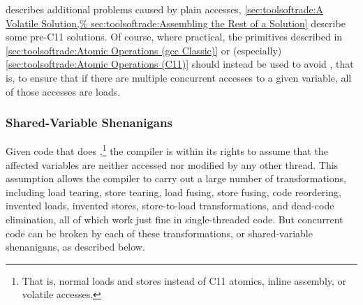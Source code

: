 \QuickQuizEnd

describes additional problems caused by plain accesses,
\cref{sec:toolsoftrade:A Volatile Solution,%
sec:toolsoftrade:Assembling the Rest of a Solution}
describe some pre-C11 solutions.
Of course, where practical, the primitives described in
\cref{sec:toolsoftrade:Atomic Operations (gcc Classic)}
or (especially)
\cref{sec:toolsoftrade:Atomic Operations (C11)}
should instead be used to avoid , that is, to ensure
that if there are multiple concurrent accesses to a given
variable, all of those accesses are loads.

\subsubsection{Shared-Variable Shenanigans}
\label{sec:toolsoftrade:Shared-Variable Shenanigans}
%
Given code that does ,\footnote{
	That is, normal loads and stores instead of C11 atomics, inline
	assembly, or volatile accesses.}
the compiler is within
its rights to assume that the affected variables are neither accessed
nor modified by any other thread.
This assumption allows the compiler to carry out a large number of
transformations, including load tearing, store tearing,
load fusing, store fusing, code reordering, invented loads,
invented stores, store-to-load transformations, and dead-code elimination,
all of which work just fine in single-threaded code.
But concurrent code can be broken by each of these transformations,
or shared-variable shenanigans, as described below.

